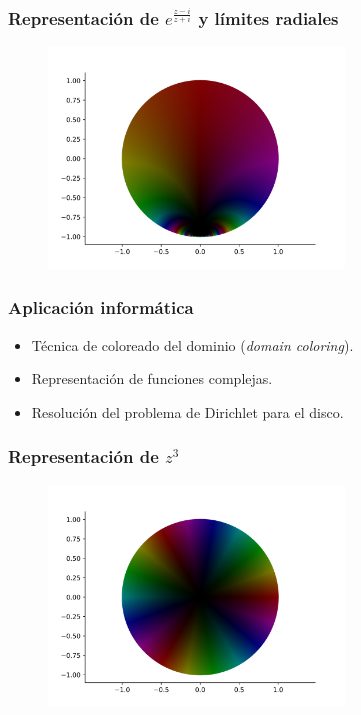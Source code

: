 \documentclass[spanish, a4paper, 12pt, final, slideColor, nototal, colorBG, pdf, noaccumulate, darkblue]{beamer}
\begin{document}
\begin{frame}
    \frametitle{Representación de $e^{\frac{z-i}{z+i}}$ y límites radiales}
    \begin{figure}[!htbp]
        \centering
        \includegraphics[width=0.7\textwidth]{../Aplicacion/e^((z-i):(z+i)).png}
        \label{fig:e^((z-i)/(z+i))}
    \end{figure}
\end{frame}


\begin{frame}
    \frametitle{Aplicación informática}
    \begin{itemize}
        \item Técnica de coloreado del dominio (\textit{domain coloring}).
        \item Representación de funciones complejas.
        \item Resolución del problema de Dirichlet para el disco.
    \end{itemize}
\end{frame}

\begin{frame}
    \frametitle{Representación de $z^3$}
    \begin{figure}[!htbp]
        \centering
        \includegraphics[width=0.7\textwidth]{../Aplicacion/z^3(2).png}
        \label{fig:z^3(2)}
    \end{figure}
\end{frame}
\end{document}
